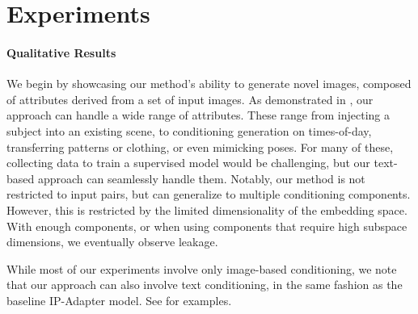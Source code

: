 
\section{Experiments}

\paragraph{\textbf{Qualitative Results}}
We begin by showcasing our method's ability to generate novel images, composed of attributes derived from a set of input images. As demonstrated in , our approach can handle a wide range of attributes. These range from injecting a subject into an existing scene, to conditioning generation on times-of-day, transferring patterns or clothing, or even mimicking poses. For many of these, collecting data to train a supervised model would be challenging, but our text-based approach can seamlessly handle them. Notably, our method is not restricted to input pairs, but can generalize to multiple conditioning components. However, this is restricted by the limited dimensionality of the embedding space. With enough components, or when using components that require high subspace dimensions, we eventually observe leakage. 

While most of our experiments involve only image-based conditioning, we note that our approach can also involve text conditioning, in the same fashion as the baseline IP-Adapter model. See  for examples.


